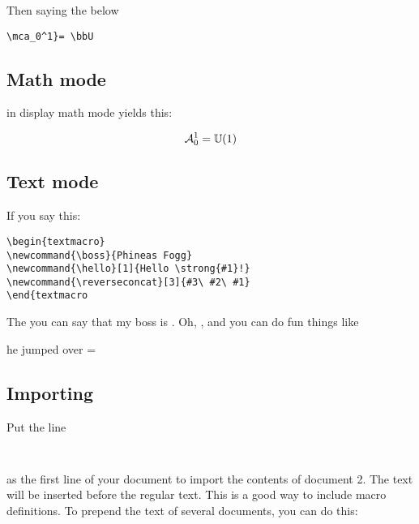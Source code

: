 \begin{mathmacro}
\newcommand{\bbU}[0]{\mathbb{U}}
\newcommand{\mca}[0]{\mathcal{A}}
\end{mathmacro}

Then saying the below

\begin{verbatim}
\mca_0^1}= \bbU
\end{verbatim}

\subsection{Math mode}

in display math mode yields this:

$$
\mca_0^1 = \bbU(1)
$$


\subsection{Text mode}

\begin{textmacro}
\newcommand{\boss}{Phineas Fogg}
\newcommand{\hello}[1]{Hello \strong{#1}!}
\newcommand{\reverseconcat}[3]{#3#2#1}
\end{textmacro}


If you say this:

\begin{verbatim}
\begin{textmacro}
\newcommand{\boss}{Phineas Fogg}
\newcommand{\hello}[1]{Hello \strong{#1}!}
\newcommand{\reverseconcat}[3]{#3\ #2\ #1}
\end{textmacro
\end{verbatim}

The you can say that my boss is \boss. Oh, , and you can do fun things like

\begin{center}
he jumped over = 
\end{center}

\subsection{Importing}

Put the line

\begin{verbatim}
  
\end{verbatim}

as the first line of your document to import the contents of document 2.  The text will be inserted before the regular text.  This is a good way to include macro definitions.  To prepend the text of several documents, you can do this:

